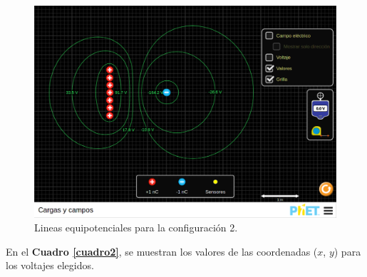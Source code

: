 \documentclass[letter,11pt]{article}
\begin{document}
\begin{figure}[!h]
\centering
\includegraphics[scale=0.34]{resources/figura06.eps}
\caption{Lineas equipotenciales para la configuración 2.}
\label{figura6}
\end{figure}

En el \textbf{Cuadro \ref{cuadro2}}, se muestran los valores de las coordenadas
($x$, $y$) para los voltajes elegidos.
\end{document}
